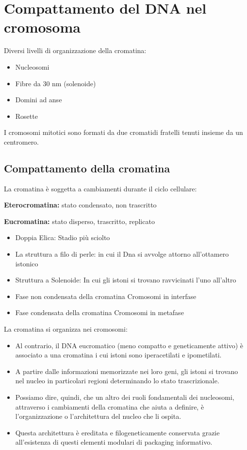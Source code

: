 \documentclass{article}
\begin{document}
\section{Compattamento del DNA nel cromosoma} Diversi livelli di organizzazione della cromatina:
\begin{itemize}
    \item Nucleosomi
    \item Fibre da 30 nm (solenoide)
    \item Domini ad anse
    \item Rosette
\end{itemize}

I cromosomi mitotici sono formati da due cromatidi fratelli tenuti insieme da un centromero.

\subsection{Compattamento della cromatina} La cromatina è soggetta a cambiamenti durante il ciclo cellulare:\par
\textbf{Eterocromatina:} stato condensato, non trascritto\par
\textbf{Eucromatina:} stato disperso, trascritto, replicato\par
\begin{itemize}
    \item Doppia Elica:
        \subitem Stadio più sciolto
    \item La struttura a filo di perle:
        \subitem in cui il Dna si avvolge attorno all'ottamero istonico
    \item Struttura a Solenoide:
        \subitem In cui gli istoni si trovano ravvicinati l'uno all'altro
    \item Fase non condensata della cromatina
        \subitem Cromosomi in interfase
    \item Fase condensata della cromatina
        \subitem Cromosomi in metafase
\end{itemize}
La cromatina si organizza nei cromosomi:
\begin{itemize}
    \item Al contrario, il DNA eucromatico (meno compatto e geneticamente attivo) è associato a una cromatina i cui istoni sono iperacetilati e ipometilati.
    \item A partire dalle informazioni memorizzate nei loro geni, gli istoni si trovano nel nucleo in particolari regioni determinando lo stato trascrizionale. 
    \item Possiamo dire, quindi, che un altro dei ruoli fondamentali dei nucleosomi, attraverso i cambiamenti della cromatina che aiuta a definire, è l'organizzazione o l'architettura del nucleo che li ospita. 
    \item Questa architettura è ereditata e filogeneticamente conservata grazie all'esistenza di questi elementi modulari di packaging informativo.
\end{itemize}
\end{document}
